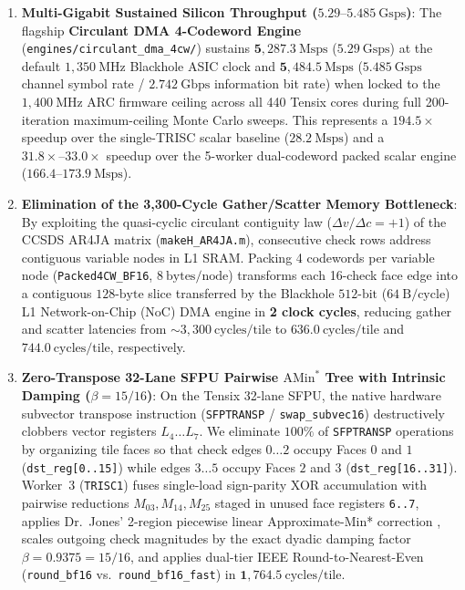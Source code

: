 \documentclass[10pt]{article}
\begin{document}
\begin{enumerate}[leftmargin=1.8em, itemsep=3pt]
    \item \textbf{Multi-Gigabit Sustained Silicon Throughput ($5.29\text{--}5.485\ \mathrm{Gsps}$)}: The flagship \textbf{Circulant DMA 4-Codeword Engine} (\texttt{engines/circulant\_dma\_4cw/}) sustains $\mathbf{5,287.3\ \mathrm{Msps}}$ ($\mathbf{5.29\ \mathrm{Gsps}}$) at the default $1,350\ \mathrm{MHz}$ Blackhole ASIC clock and $\mathbf{5,484.5\ \mathrm{Msps}}$ ($\mathbf{5.485\ \mathrm{Gsps}}$ channel symbol rate / $\mathbf{2.742\ \mathrm{Gbps}}$ information bit rate) when locked to the $1,400\ \mathrm{MHz}$ ARC firmware ceiling across all 440 Tensix cores during full 200-iteration maximum-ceiling Monte Carlo sweeps. This represents a $\mathbf{194.5\times}$ speedup over the single-TRISC scalar baseline ($28.2\ \mathrm{Msps}$) and a $\mathbf{31.8\times\text{--}33.0\times}$ speedup over the 5-worker dual-codeword packed scalar engine ($166.4\text{--}173.9\ \mathrm{Msps}$).
    \item \textbf{Elimination of the 3,300-Cycle Gather/Scatter Memory Bottleneck}: By exploiting the quasi-cyclic circulant contiguity law ($\Delta v / \Delta c = +1$) of the CCSDS AR4JA matrix (\texttt{makeH\_AR4JA.m}), consecutive check rows address contiguous variable nodes in L1 SRAM. Packing 4 codewords per variable node (\texttt{Packed4CW\_BF16}, $8\ \mathrm{bytes/node}$) transforms each 16-check face edge into a contiguous $128\text{-byte}$ slice transferred by the Blackhole $512\text{-bit}$ ($64\ \mathrm{B/cycle}$) L1 Network-on-Chip (NoC) DMA engine in \textbf{2 clock cycles}, reducing gather and scatter latencies from $\sim 3,300\ \mathrm{cycles/tile}$ to $\mathbf{636.0\ \mathrm{cycles/tile}}$ and $\mathbf{744.0\ \mathrm{cycles/tile}}$, respectively.
    \item \textbf{Zero-Transpose 32-Lane SFPU Pairwise $\mathrm{AMin}^*$ Tree with Intrinsic Damping ($\beta = 15/16$)}: On the Tensix 32-lane SFPU, the native hardware subvector transpose instruction (\texttt{SFPTRANSP} / \texttt{swap\_subvec16}) destructively clobbers vector registers $L_4 \dots L_7$. We eliminate $100\%$ of \texttt{SFPTRANSP} operations by organizing tile faces so that check edges $0 \dots 2$ occupy Faces $0$ and $1$ (\texttt{dst\_reg[0..15]}) while edges $3 \dots 5$ occupy Faces $2$ and $3$ (\texttt{dst\_reg[16..31]}). Worker~3 (\texttt{TRISC1}) fuses single-load sign-parity XOR accumulation with pairwise reductions $M_{03}, M_{14}, M_{25}$ staged in unused face registers \texttt{6..7}, applies Dr.~Jones' 2-region piecewise linear Approximate-Min* correction \cite{jones_approx_min_star}, scales outgoing check magnitudes by the exact dyadic damping factor $\beta = 0.9375 = 15/16$, and applies dual-tier IEEE Round-to-Nearest-Even (\texttt{round\_bf16} vs.\ \texttt{round\_bf16\_fast}) in $\mathbf{1,764.5\ \mathrm{cycles/tile}}$.

\end{enumerate}
\end{document}
